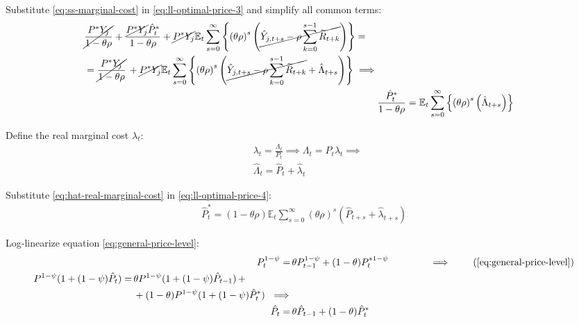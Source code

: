 \documentclass[
	12pt,
	]{article}
\numberwithin{equation}{section}
\newcommand{\E}[1][t]{{\mathbb{E}_{#1}}}
\theoremstyle{definition}
\theoremstyle{plain}
\theoremstyle{plain}
\theoremstyle{plain}
\begin{document}
Substitute \ref{eq:ss-marginal-cost} in \ref{eq:ll-optimal-price-3} and simplify all common terms:
\begin{align}
	\begin{split}
		& \cancel{\frac{P^\ast Y_{j}}{1-\theta\rho}} + \frac{ \cancel{P^\ast Y_{j}} \hat{P}_t^\ast }{1- \theta \rho} + \cancel{P^\ast Y_{j}} \E \sum_{s=0}^{\infty} \left\{ \left( \theta \rho \right)^s \left( \cancel{\hat{Y}_{j,t+s} - \rho \sum_{k=0}^{s-1} \widetilde{R}_{t+k}} \right) \right\} = 
	\\
		& = \cancel{\frac{P^\ast Y_{j}}{1-\theta\rho}} \, + \cancel{P^\ast Y_{j}} \E \sum_{s=0}^{\infty} \left\{ \left( \theta \rho \right)^s \left( \cancel{\hat{Y}_{j,t+s} - \rho \sum_{k=0}^{s-1} \widetilde{R}_{t+k}} + \hat{\Lambda}_{t+s} \right) \right\} \implies	
	\end{split} \nonumber \\
	& \frac{ \hat{P}_t^\ast }{1- \theta \rho} = \E \sum_{s=0}^{\infty} \left\{ \left( \theta \rho \right)^s \left( \hat{\Lambda}_{t+s} \right) \right\} \label{eq:ll-optimal-price-4}
\end{align}

Define the real marginal cost $\lambda_t$:
\begin{align}
	& \lambda_t = \frac{\Lambda_t}{P_t} \implies \Lambda_t = P_t \lambda_t \implies \nonumber \\
	& \hat{\Lambda}_t = \hat{P}_t + \hat{\lambda}_t \label{eq:hat-real-marginal-cost}
\end{align}

Substitute \ref{eq:hat-real-marginal-cost} in \ref{eq:ll-optimal-price-4}:
\begin{align}
	\hat{P}_t^\ast = (1- \theta \rho) \E \sum_{s=0}^{\infty} \left( \theta \rho \right)^s \left( \hat{P}_{t+s} + \hat{\lambda}_{t+s} \right) \label{eq:ll-optimal-price-5}
\end{align}

Log-linearize equation \ref{eq:general-price-level}:
\begin{align}
	P_t^{1-\psi} =\, &\theta P_{t-1}^{1-\psi} + (1-\theta) P_t^{\ast 1-\psi} \qquad \qquad \implies \tag{\ref{eq:general-price-level}} \\
	\begin{split} P^{1-\psi} (1 + (1-\psi)\hat{P}_t) =\, &\theta P^{1-\psi} (1 + (1-\psi)\hat{P}_{t-1}) \, + \\ & + (1-\theta) P^{1-\psi} (1 + (1-\psi)\hat{P}_t^\ast) \ \implies \nonumber \end{split} \\
	\hat{P}_t =\, &\theta \hat{P}_{t-1} + (1-\theta) \hat{P}_t^\ast
	\label{eq:ll-general-price-level}
\end{align}
\end{document}
